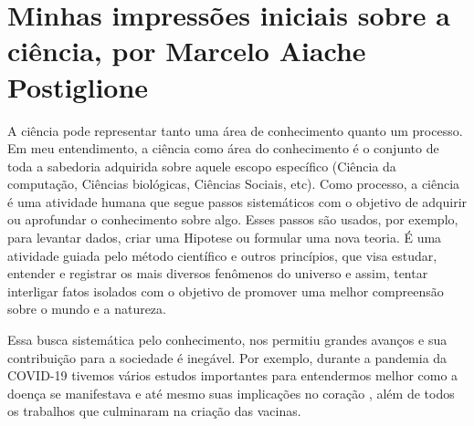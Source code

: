 \section{Minhas impressões iniciais sobre a ciência, por Marcelo Aiache Postiglione}

A ciência pode representar tanto uma área de conhecimento quanto um processo. Em meu entendimento, a ciência como área do conhecimento é o conjunto de toda a sabedoria adquirida sobre aquele escopo específico (Ciência da computação, Ciências biológicas, Ciências Sociais, etc). Como processo, a ciência é uma atividade humana que segue passos sistemáticos com o objetivo de adquirir ou aprofundar o conhecimento sobre algo. Esses passos são usados, por exemplo, para levantar dados, criar uma \gls{Hipotese} ou formular uma nova teoria. É uma atividade guiada pelo método científico e outros princípios, que visa estudar, entender e registrar os mais diversos fenômenos do universo e assim, tentar  interligar fatos isolados com o objetivo de promover uma melhor compreensão sobre o mundo e a natureza. 

Essa busca sistemática pelo conhecimento, nos permitiu grandes avanços e sua contribuição para a sociedade é inegável. Por exemplo, durante a pandemia da COVID-19 tivemos vários estudos importantes para entendermos melhor como a doença se manifestava e até mesmo suas implicações no coração \cite{strabelli_covid-19_2020}, além de todos os trabalhos que culminaram na criação das vacinas.